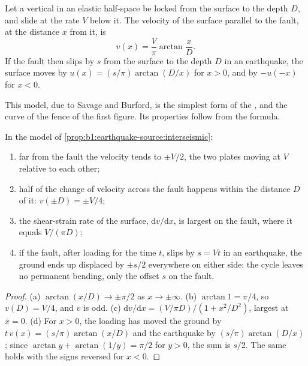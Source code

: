 \begin{proposition}\label{prop:b1:earthquake-source:interseismic}
Let a vertical  in an elastic half-space be locked from the
surface to the depth $D$, and slide at the rate $V$ below it. The velocity of
the surface parallel to the fault, at the distance $x$ from it, is
\[
  v(x) = \frac{V}{\pi}\arctan\frac{x}{D} .
\]
If the fault then slips by $s$ from the surface to the depth $D$ in an
earthquake, the surface moves by $u(x) = (s/\pi)\arctan(D/x)$ for $x > 0$, and by
$-u(-x)$ for $x < 0$.
\end{proposition}
\admitted

This model, due to Savage and Burford, is the simplest form of the , and the curve of the fence of the first figure. Its properties follow
from the formula.

\begin{proposition}\label{prop:b1:earthquake-source:profile}
In the model of \cref{prop:b1:earthquake-source:interseismic}:
\begin{enumerate}[label=(\alph*)]
  \item far from the fault the velocity tends to $\pm V/2$, the two plates
        moving at $V$ relative to each other;
  \item half of the change of velocity across the fault happens within the
        distance $D$ of it: $v(\pm D) = \pm V/4$;
  \item the shear-strain rate of the surface, $\mathrm dv/\mathrm dx$, is
        largest on the fault, where it equals $V/(\pi D)$;
  \item if the fault, after loading for the time $t$, slips by $s = Vt$ in an
        earthquake, the ground ends up displaced by $\pm s/2$ everywhere on
        either side: the cycle leaves no permanent bending, only the offset $s$
        on the fault.
\end{enumerate}
\end{proposition}

\begin{proof}
(a) $\arctan(x/D) \to \pm\pi/2$ as $x \to \pm\infty$. (b) $\arctan 1 = \pi/4$,
so $v(D) = V/4$, and $v$ is odd. (c) $\mathrm dv/\mathrm dx = (V/\pi D)/(1 +
x^2/D^2)$, largest at $x = 0$. (d) For $x > 0$, the loading has moved the
ground by $t\,v(x) = (s/\pi)\arctan(x/D)$ and the earthquake by
$(s/\pi)\arctan(D/x)$; since $\arctan y + \arctan(1/y) = \pi/2$ for $y > 0$,
the sum is $s/2$. The same holds with the signs reversed for $x < 0$.
\end{proof}

